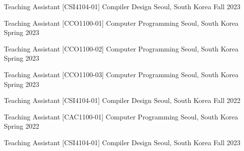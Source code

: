 

\begin{cventries}

  \cventry
    {Teaching Assistant} %
    {[CSI4104-01] Compiler Design} %
    {Seoul, South Korea} %
    {Fall 2023} %
    {}

  \cventry
    {Teaching Assistant} %
    {[CCO1100-01] Computer Programming} %
    {Seoul, South Korea} %
    {Spring 2023} %
    {}

  \cventry
    {Teaching Assistant} %
    {[CCO1100-02] Computer Programming} %
    {Seoul, South Korea} %
    {Spring 2023} %
    {}

  \cventry
    {Teaching Assistant} %
    {[CCO1100-03] Computer Programming} %
    {Seoul, South Korea} %
    {Spring 2023} %
    {}

  \cventry
    {Teaching Assistant} %
    {[CSI4104-01] Compiler Design} %
    {Seoul, South Korea} %
    {Fall 2022} %
    {}

  \cventry
    {Teaching Assistant} %
    {[CAC1100-01] Computer Programming} %
    {Seoul, South Korea} %
    {Spring 2022} %
    {}


    \cventry
    {Teaching Assistant} %
    {[CSI4104-01] Compiler Design} %
    {Seoul, South Korea} %
    {Fall 2023} %
    {}
\end{cventries}
